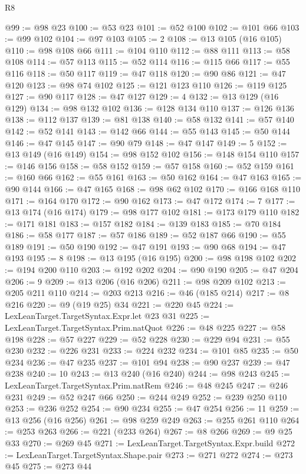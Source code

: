 \begin{lexlean}{R8}
\begin{coremodule}
@99 := @98 @23
@100 := @53 @23
@101 := @52 @100
@102 := @101 @66
@103 := @99 @102
@104 := @97 @103
@105 := 2
@108 := @13 @105 (@16 @105)
@110 := @98 @108 @66
@111 := @104 @110
@112 := @88 @111
@113 := @58 @108
@114 := @57 @113
@115 := @52 @114
@116 := @115 @66
@117 := @55 @116
@118 := @50 @117
@119 := @47 @118
@120 := @90 @86
@121 := @47 @120
@123 := @98 @74 @102
@125 := @121 @123 @110
@126 := @119 @125
@127 := @90 @117
@128 := @47 @127
@129 := 4
@132 := @13 @129 (@16 @129)
@134 := @98 @132 @102
@136 := @128 @134 @110
@137 := @126 @136
@138 := @112 @137
@139 := @81 @138
@140 := @58 @132
@141 := @57 @140
@142 := @52 @141
@143 := @142 @66
@144 := @55 @143
@145 := @50 @144
@146 := @47 @145
@147 := @90 @79
@148 := @47 @147
@149 := 5
@152 := @13 @149 (@16 @149)
@154 := @98 @152 @102
@156 := @148 @154 @110
@157 := @146 @156
@158 := @58 @152
@159 := @57 @158
@160 := @52 @159
@161 := @160 @66
@162 := @55 @161
@163 := @50 @162
@164 := @47 @163
@165 := @90 @144
@166 := @47 @165
@168 := @98 @62 @102
@170 := @166 @168 @110
@171 := @164 @170
@172 := @90 @162
@173 := @47 @172
@174 := 7
@177 := @13 @174 (@16 @174)
@179 := @98 @177 @102
@181 := @173 @179 @110
@182 := @171 @181
@183 := @157 @182
@184 := @139 @183
@185 := @70 @184
@186 := @58 @177
@187 := @57 @186
@189 := @52 @187 @66
@190 := @55 @189
@191 := @50 @190
@192 := @47 @191
@193 := @90 @68
@194 := @47 @193
@195 := 8
@198 := @13 @195 (@16 @195)
@200 := @98 @198 @102
@202 := @194 @200 @110
@203 := @192 @202
@204 := @90 @190
@205 := @47 @204
@206 := 9
@209 := @13 @206 (@16 @206)
@211 := @98 @209 @102
@213 := @205 @211 @110
@214 := @203 @213
@216 := @46 (@185 @214)
@217 := @8 @216
@220 := @9 (@19 @25) @34
@221 := @220 @45
@224 := LexLeanTarget.TargetSyntax.Expr.let @23 @31
@225 := LexLeanTarget.TargetSyntax.Prim.natQuot
@226 := @48 @225
@227 := @58 @198
@228 := @57 @227
@229 := @52 @228
@230 := @229 @94
@231 := @55 @230
@232 := @226 @231
@233 := @224 @232
@234 := @101 @85
@235 := @50 @234
@236 := @47 @235
@237 := @101 @94
@238 := @90 @237
@239 := @47 @238
@240 := 10
@243 := @13 @240 (@16 @240)
@244 := @98 @243
@245 := LexLeanTarget.TargetSyntax.Prim.natRem
@246 := @48 @245
@247 := @246 @231
@249 := @52 @247 @66
@250 := @244 @249
@252 := @239 @250 @110
@253 := @236 @252
@254 := @90 @234
@255 := @47 @254
@256 := 11
@259 := @13 @256 (@16 @256)
@261 := @98 @259 @249
@263 := @255 @261 @110
@264 := @253 @263
@266 := @221 (@233 @264)
@267 := @8 @266
@269 := @9 @25 @33
@270 := @269 @45
@271 := LexLeanTarget.TargetSyntax.Expr.build
@272 := LexLeanTarget.TargetSyntax.Shape.pair
@273 := @271 @272
@274 := @273 @45
@275 := @273 @44

\end{coremodule}
\end{lexlean}
